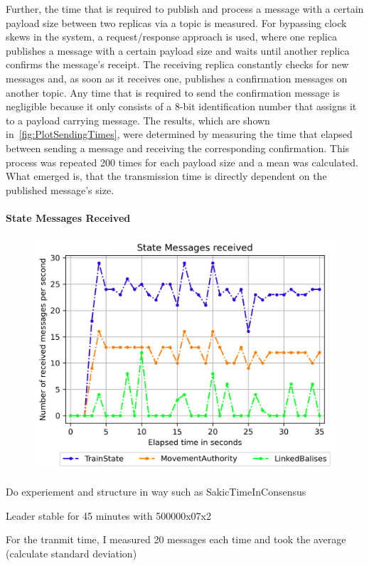 Further, the time that is required to publish and process a message with a certain payload size between two replicas via a  topic is measured.
For bypassing clock skews in the system, a request/response approach is used, where one replica publishes a message with a certain payload size and waits until another replica confirms the message's receipt.
The receiving replica constantly checks for new messages and, as soon as it receives one, publishes a confirmation messages on another topic.
Any time that is required to send the confirmation message is negligible because it only consists of a 8-bit identification number that assigns it to a payload carrying message.
The results, which are shown in~\autoref{fig:PlotSendingTimes}, were determined by measuring the time that elapsed between sending a message and receiving the corresponding confirmation.
This process was repeated 200 times for each payload size and a mean was calculated.
What emerged is, that the transmission time is directly dependent on the published message's size.



\paragraph{State Messages Received}

\begin{figure}[!htb]
	\centering
	\includegraphics[width=0.75\linewidth]{images/plots/StateMessagesReceive}
	\caption{}
	\label{fig:PlotStateMessagesReceive}
\end{figure}


Do experiement and structure in way such as SakicTimeInConsensus

Leader stable for 45 minutes with 500000x07x2

For the tranmit time, I measured 20 messages each time and took the average (calculate standard deviation)
\fi
